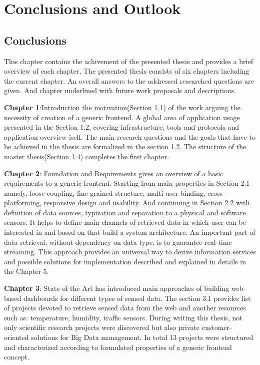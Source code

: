\chapter{Conclusions and Outlook}

\section{Conclusions}
	This chapter contains the achivement of the presented thesis and provides a brief overview of each chapter. The presented thesis consists of six chapters including the current chapter. An overall answers to the addressed researched questions are given. And chapter underlined with future work proposals and descriptions.

	\textbf{Chapter 1}:Introduction
	\newline
	 the motivation(Section 1.1) of the work arguing the necessity of creation of a generic frontend. A global area of application usage presented in the Section 1.2, covering infrastructure, tools and protocols and application overview iself. The main research questions and the goals that have to be achieved in the thesis are formalized in the section 1.2. The structure of the master thesis(Section 1.4) completes the first chapter. 
   
    \textbf{Chapter 2}: Foundation and Requirements
    \newline
    gives an overview of a basic requirements to a generic frontend. Starting from main properties in Section 2.1 namely, loose coupling, fine-grained structure, multi-user binding, cross-platforming, responsive design and usability. And continuing in Section 2.2 with definition of data sources, typization and separation to a physical and software sensors. It helps to define main channels of retrieved data in which user can be interested in and based on that build a system architecture. An important part of data retrieval, without dependency on data type, is to guarantee real-time streaming. This approach provides an universal way to derive information services and possible solutions for implementation described and explained in details in the Chapter 5.
    
    \textbf{Chapter 3}: State of the Art
    \newline
	has introduced main approaches of building web-based dashboards for different types of sensed data. The section 3.1 provides list of projects devoted to retrieve sensed data from the web and another resources such as: temperature, humidity, traffic sensors. During writing this thesis, not only scientific research projects were discovered but also private customer-oriented solutions for Big Data management. In total 13 projects were structured and characterized according to formulated properties of a generic frontend concept.

